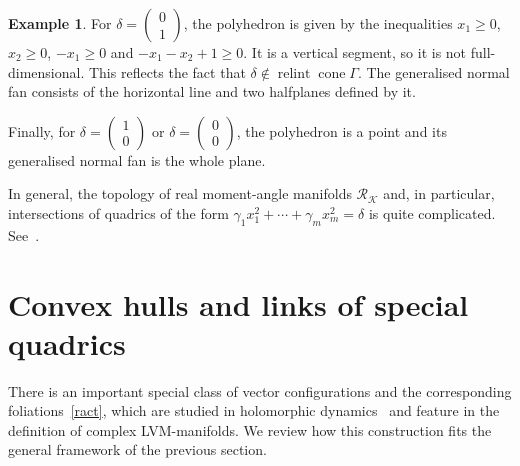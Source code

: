 \documentclass[a4paper]{amsart}
\theoremstyle{definition}
\newtheorem{example}[theorem]{Example}
\theoremstyle{remark}
\numberwithin{equation}{section}
\renewcommand{\ge}{\geqslant}
\def\cone{\mathop{\mathrm{cone}}}
\def\relint{\mathop{\mathrm{relint}}}
\def\rk{\mathcal R_{\mathcal K}}
\newcommand{\<}{\langle}
\renewcommand{\>}{\rangle}
\begin{document}
\begin{example}
For $\delta=\begin{pmatrix}0\\1\end{pmatrix}$, the polyhedron is given by the inequalities $x_1\ge0$, $x_2\ge0$, $-x_1\ge0$ and $-x_1-x_2+1\ge0$. It is a vertical segment, so it is not full-dimensional. This reflects the fact that $\delta\notin\relint\cone\Gamma$. The generalised normal fan consists of the horizontal line and two halfplanes defined by it.

Finally, for $\delta=\begin{pmatrix}1\\0\end{pmatrix}$ or 
$\delta=\begin{pmatrix}0\\0\end{pmatrix}$, the polyhedron is a point and its generalised normal fan is the whole plane.
\end{example}


In general, the topology of real moment-angle manifolds $\rk$ and, in particular, intersections of quadrics of the form $\gamma_1x_1^2+\cdots+\gamma_mx_m^2=\delta$ is quite complicated. See~\cite[Chapters~4 and~6]{bu-pa15}.




\section{Convex hulls and links of special quadrics}\label{convlink}
There is an important special class of vector configurations and the corresponding foliations~\eqref{ract}, which are studied in holomorphic dynamics~\cite{meer00, me-ve04, bosi01, bo-me06} and feature in the definition of complex LVM-manifolds. We review how this  construction fits the general framework of the previous section.
\end{document}
